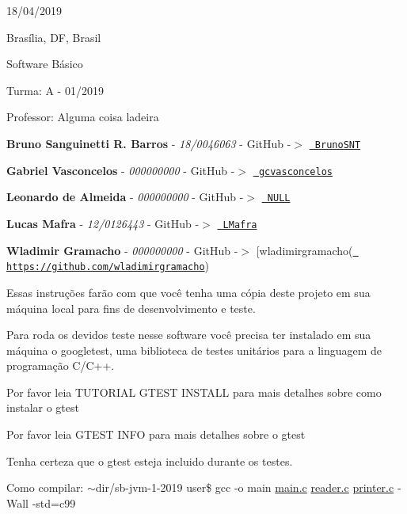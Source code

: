 
\begin{DoxyItemize}
\item 18/04/2019
\item Brasília, DF, Brasil
\item Software Básico
\item Turma\+: A -\/ 01/2019
\item Professor\+: Alguma coisa ladeira
\end{DoxyItemize}


\begin{DoxyItemize}
\item {\bfseries{Bruno Sanguinetti R. Barros}} -\/ {\itshape 18/0046063} -\/ Git\+Hub -\/$>$ \href{https://github.com/BrunoSNT}{\texttt{ Bruno\+S\+NT}}
\item {\bfseries{Gabriel Vasconcelos}} -\/ {\itshape 000000000} -\/ Git\+Hub -\/$>$ \href{https://github.com/gcvasconcelos}{\texttt{ gcvasconcelos}}
\item {\bfseries{Leonardo de Almeida}} -\/ {\itshape 000000000} -\/ Git\+Hub -\/$>$ \href{https://github.com/}{\texttt{ N\+U\+LL}}
\item {\bfseries{Lucas Mafra}} -\/ {\itshape 12/0126443} -\/ Git\+Hub -\/$>$ \href{https://github.com/LMafra}{\texttt{ L\+Mafra}}
\item {\bfseries{Wladimir Gramacho}} -\/ {\itshape 000000000} -\/ Git\+Hub -\/$>$ \mbox{[}wladimirgramacho(\href{https://github.com/wladimirgramacho}{\texttt{ https\+://github.\+com/wladimirgramacho}})
\end{DoxyItemize}

Essas instruções farão com que você tenha uma cópia deste projeto em sua máquina local para fins de desenvolvimento e teste.

Para roda os devidos teste nesse software você precisa ter instalado em sua máquina o googletest, uma biblioteca de testes unitários para a linguagem de programação C/\+C++.

Por favor leia T\+U\+T\+O\+R\+I\+AL G\+T\+E\+ST I\+N\+S\+T\+A\+LL para mais detalhes sobre como instalar o gtest

Por favor leia G\+T\+E\+ST I\+N\+FO para mais detalhes sobre o gtest

Tenha certeza que o gtest esteja incluido durante os testes. 
\begin{DoxyCode}{0}
\end{DoxyCode}


Como compilar\+: {\ttfamily $\sim$dir/sb-\/jvm-\/1-\/2019 user\$ gcc -\/o main \mbox{\hyperlink{main_8c}{main.\+c}} \mbox{\hyperlink{reader_8c}{reader.\+c}} \mbox{\hyperlink{printer_8c}{printer.\+c}} -\/Wall -\/std=c99}

